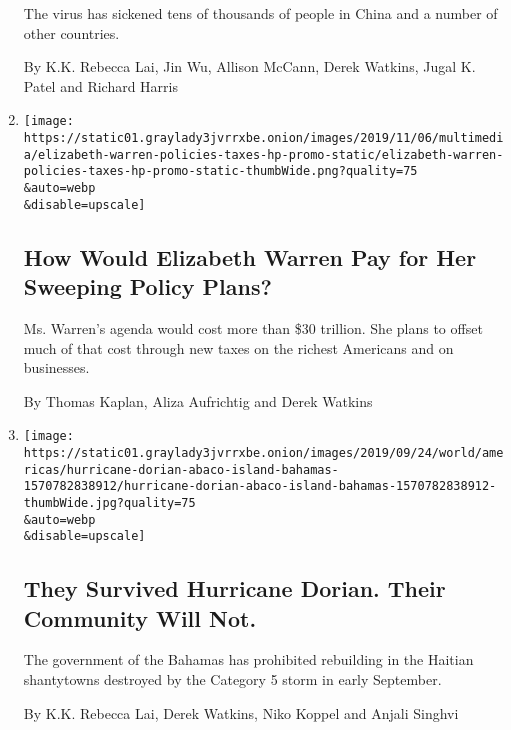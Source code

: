 \begin{enumerate}
  The virus has sickened tens of thousands of people in China and a
  number of other countries.

  By K.K. Rebecca Lai, Jin Wu, Allison McCann, Derek Watkins, Jugal K.
  Patel and Richard Harris
\item
  \href{/interactive/2019/11/06/us/politics/elizabeth-warren-policies-taxes.html}{}

  \texttt{[image: https://static01.graylady3jvrrxbe.onion/images/2019/11/06/multimedia/elizabeth-warren-policies-taxes-hp-promo-static/elizabeth-warren-policies-taxes-hp-promo-static-thumbWide.png?quality=75\\\&auto=webp\\\&disable=upscale]}

  \hypertarget{how-would-elizabeth-warren-pay-for-her-sweeping-policy-plans}{%
  \subsection{How Would Elizabeth Warren Pay for Her Sweeping Policy
  Plans?}\label{how-would-elizabeth-warren-pay-for-her-sweeping-policy-plans}}

  Ms. Warren's agenda would cost more than \$30 trillion. She plans to
  offset much of that cost through new taxes on the richest Americans
  and on businesses.

  By Thomas Kaplan, Aliza Aufrichtig and Derek Watkins
\item
  \href{/interactive/2019/09/25/world/americas/hurricane-dorian-abaco-island-bahamas.html}{}

  \texttt{[image: https://static01.graylady3jvrrxbe.onion/images/2019/09/24/world/americas/hurricane-dorian-abaco-island-bahamas-1570782838912/hurricane-dorian-abaco-island-bahamas-1570782838912-thumbWide.jpg?quality=75\\\&auto=webp\\\&disable=upscale]}

  \hypertarget{they-survived-hurricane-dorian-their-community-will-not}{%
  \subsection{They Survived Hurricane Dorian. Their Community Will
  Not.}\label{they-survived-hurricane-dorian-their-community-will-not}}

  The government of the Bahamas has prohibited rebuilding in the Haitian
  shantytowns destroyed by the Category 5 storm in early September.

  By K.K. Rebecca Lai, Derek Watkins, Niko Koppel and Anjali Singhvi
\end{enumerate}

